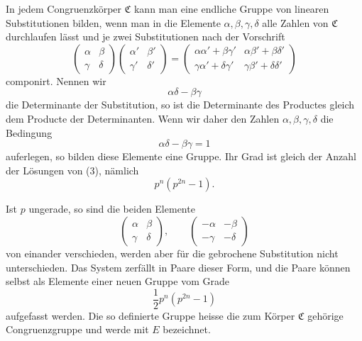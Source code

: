 \documentclass[11pt]{article}
\begin{document}
In jedem Congruenzkörper $\mathfrak C$ kann man eine endliche Gruppe von linearen Substitutionen bilden, wenn man in die Elemente $\alpha,\beta,\gamma,\delta$ alle Zahlen von $\mathfrak C$ durchlaufen lässt und je zwei Substitutionen nach der Vorschrift
\begin{equation}
 \begin{pmatrix}\alpha&\beta\\\gamma&\delta\end{pmatrix}
 \begin{pmatrix}\alpha'&\beta'\\\gamma'&\delta'\end{pmatrix}
 =
 \begin{pmatrix}
 \alpha\alpha'+\beta\gamma'&\alpha\beta'+\beta\delta'\\
 \gamma\alpha'+\delta\gamma'&\gamma\beta'+\delta\delta'
 \end{pmatrix} \tag{2}
\end{equation}
componirt. Nennen wir
\[
 \alpha\delta-\beta\gamma
\]
die Determinante der Substitution, so ist die Determinante des Productes gleich dem Producte der Determinanten. Wenn wir daher den Zahlen $\alpha,\beta,\gamma,\delta$ die Bedingung
\begin{equation}
 \alpha\delta-\beta\gamma=1 \tag{3}
\end{equation}
auferlegen, so bilden diese Elemente eine Gruppe. Ihr Grad ist gleich der Anzahl der Lösungen von (3), nämlich
\begin{equation}
 p^n(p^{2n}-1). \tag{4}
\end{equation}

Ist $p$ ungerade, so sind die beiden Elemente
\begin{equation}
 \begin{pmatrix}\alpha&\beta\\\gamma&\delta\end{pmatrix},\qquad
 \begin{pmatrix}-\alpha&-\beta\\-\gamma&-\delta\end{pmatrix} \tag{5}
\end{equation}
von einander verschieden, werden aber für die gebrochene Substitution nicht unterschieden. Das System zerfällt in Paare dieser Form, und die Paare können selbst als Elemente einer neuen Gruppe vom Grade
\begin{equation}
 \frac12 p^n(p^{2n}-1) \tag{6}
\end{equation}
aufgefasst werden. Die so definierte Gruppe heisse die zum Körper $\mathfrak C$ gehörige Congruenzgruppe und werde mit $E$ bezeichnet.
\end{document}
